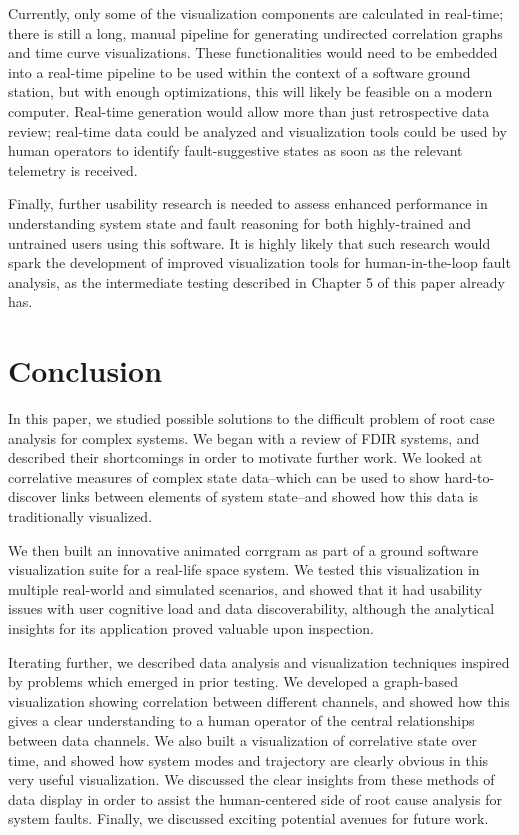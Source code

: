 Currently, only some of the visualization components are calculated in real-time; there is still a long, manual pipeline for generating undirected correlation graphs and time curve visualizations. These functionalities would need to be embedded into a real-time pipeline to be used within the context of a software ground station, but with enough optimizations, this will likely be feasible on a modern computer. Real-time generation would allow more than just retrospective data review; real-time data could be analyzed and visualization tools could be used by human operators to identify fault-suggestive states as soon as the relevant telemetry is received.

Finally, further usability research is needed to assess enhanced performance in understanding system state and fault reasoning for both highly-trained and untrained users using this software. It is highly likely that such research would spark the development of improved visualization tools for human-in-the-loop fault analysis, as the intermediate testing described in Chapter 5 of this paper already has.

\section{Conclusion}

In this paper, we studied possible solutions to the difficult problem of root case analysis for complex systems. We began with a review of FDIR systems, and described their shortcomings in order to motivate further work. We looked at correlative measures of complex state data--which can be used to show hard-to-discover links between elements of system state--and showed how this data is traditionally visualized.

We then built an innovative animated corrgram as part of a ground software visualization suite for a real-life space system. We tested this visualization in multiple real-world and simulated scenarios, and showed that it had usability issues with user cognitive load and data discoverability, although the analytical insights for its application proved valuable upon inspection.

Iterating further, we described data analysis and visualization techniques inspired by problems which emerged in prior testing. We developed a graph-based visualization showing correlation between different channels, and showed how this gives a clear understanding to a human operator of the central relationships between data channels. We also built a visualization of correlative state over time, and showed how system modes and trajectory are clearly obvious in this very useful visualization. We discussed the clear insights from these methods of data display in order to assist the human-centered side of root cause analysis for system faults. Finally, we discussed exciting potential avenues for future work.

